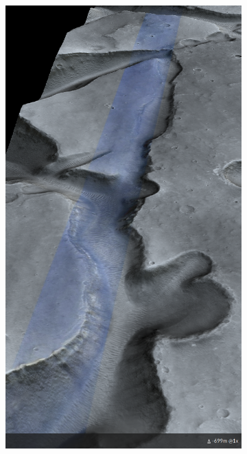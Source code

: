 \begin{figure}[h]
\captionsetup[subfigure]{justification=centering}
\vspace{-2ex}
	\centering
    \setlength{\subfigureWidth}{0.50\textwidth}
    \setlength{\graphicsHeight}{130mm}
    \hypersetup{hidelinks=true}%
    \begin{subfigure}[t]{\subfigureWidth}
        \centering
        \includegraphics[height=\graphicsHeight]{sections/mission-sites/images/western-iani-chaos-dtm.png}

\end{subfigure}
\end{figure}
